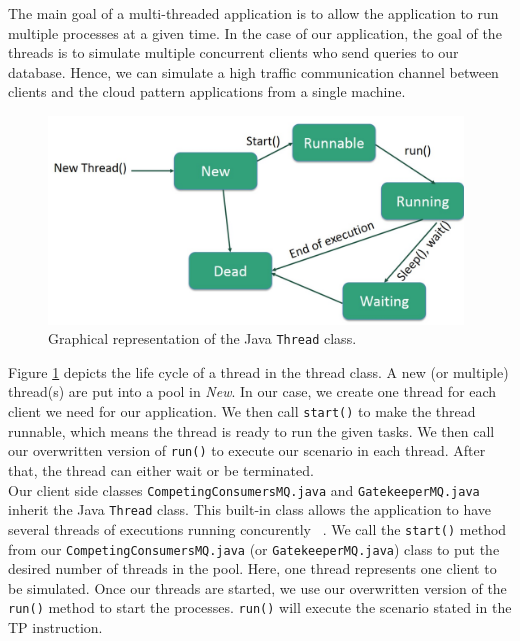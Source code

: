 \documentclass{article}
\begin{document}
The main goal of a multi-threaded application is to allow the application to run multiple processes at a given time.  In the case of our application, the goal of the threads is to simulate multiple concurrent clients who send queries to our database. Hence, we can simulate a high traffic communication channel between clients and the cloud pattern applications from a single machine. \\


\begin{figure}[t]
	\centering
	\includegraphics[width = 11cm]{images/threadSchema.jpg}
	\caption{Graphical representation of the Java \texttt{Thread} class.}
	\label{fig:Thread Schema}
\end{figure}


Figure \ref{fig:Thread Schema} depicts the life cycle of a thread in the thread class. A new (or multiple) thread(s) are put into a pool in \textit{New}. In our case, we create one thread for each client we need for our application. We then call \texttt{start()} to make the thread runnable, which means the thread is ready to run the given tasks. We then call our overwritten version of \texttt{run()} to execute our scenario in each thread. After that, the thread can either wait or be terminated.  \\ 

Our client side classes \texttt{CompetingConsumersMQ.java} and  \texttt{GatekeeperMQ.java} inherit the Java \texttt{Thread} class. This built-in class allows the application to have several threads of executions running concurently ~\cite{threads_java}. We call the \texttt{start()} method from our \texttt{CompetingConsumersMQ.java} (or \texttt{GatekeeperMQ.java}) class to put the desired number of threads in the pool. Here, one thread represents one client to be simulated. Once our threads are started, we use our overwritten version of the \texttt{run()} method to start the processes. \texttt{run()} will execute the scenario stated in the TP instruction. \\
\end{document}

